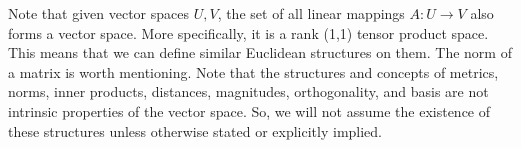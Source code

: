   Note that given vector spaces $U, V$, the set of all linear mappings $A: U \longrightarrow V$ also forms a vector space. More specifically, it is a rank (1,1) tensor product space. This means that we can define similar Euclidean structures on them. The norm of a matrix is worth mentioning. Note that the structures and concepts of metrics, norms, inner products, distances, magnitudes, orthogonality, and basis are not intrinsic properties of the vector space. So, we will not assume the existence of these structures unless otherwise stated or explicitly implied. 


